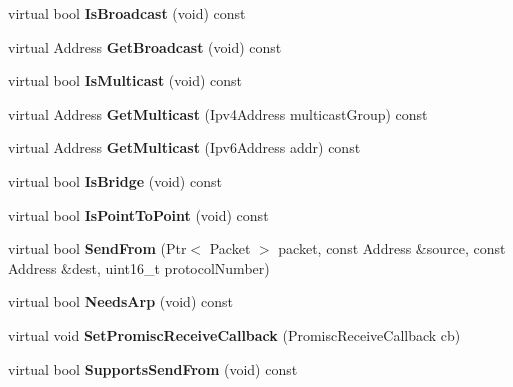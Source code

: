 \begin{DoxyCompactItemize}
virtual bool {\bfseries Is\+Broadcast} (void) const
\item 
\mbox{\label{classns3_1_1lorawan_1_1LoraNetDevice_ae1a300c93225ad2c6883a9a94fdaec7d}} 
virtual Address {\bfseries Get\+Broadcast} (void) const
\item 
\mbox{\label{classns3_1_1lorawan_1_1LoraNetDevice_a6a18359bc6d5810de4429724d9739f4b}} 
virtual bool {\bfseries Is\+Multicast} (void) const
\item 
\mbox{\label{classns3_1_1lorawan_1_1LoraNetDevice_ae7c31bab486f11391f45adadb68bea28}} 
virtual Address {\bfseries Get\+Multicast} (Ipv4\+Address multicast\+Group) const
\item 
\mbox{\label{classns3_1_1lorawan_1_1LoraNetDevice_a78323bf432c46c08f85778b2302c2d9d}} 
virtual Address {\bfseries Get\+Multicast} (Ipv6\+Address addr) const
\item 
\mbox{\label{classns3_1_1lorawan_1_1LoraNetDevice_a627f1c69aae3e26cf636ce552e2935df}} 
virtual bool {\bfseries Is\+Bridge} (void) const
\item 
\mbox{\label{classns3_1_1lorawan_1_1LoraNetDevice_aaba6ad5f7ae5116faaa3cf187b3ff2b4}} 
virtual bool {\bfseries Is\+Point\+To\+Point} (void) const
\item 
\mbox{\label{classns3_1_1lorawan_1_1LoraNetDevice_a1599faad5fed49743df75e92fd85a5f6}} 
virtual bool {\bfseries Send\+From} (Ptr$<$ Packet $>$ packet, const Address \&source, const Address \&dest, uint16\+\_\+t protocol\+Number)
\item 
\mbox{\label{classns3_1_1lorawan_1_1LoraNetDevice_a51420025e2f9a1c625ea25a9c8928d35}} 
virtual bool {\bfseries Needs\+Arp} (void) const
\item 
\mbox{\label{classns3_1_1lorawan_1_1LoraNetDevice_ae984d46514ee678426669b7dd40bf97e}} 
virtual void {\bfseries Set\+Promisc\+Receive\+Callback} (Promisc\+Receive\+Callback cb)
\item 
\mbox{\label{classns3_1_1lorawan_1_1LoraNetDevice_a10ed1ae7d2d3f0e48a150052b952190a}} 
virtual bool {\bfseries Supports\+Send\+From} (void) const
\end{DoxyCompactItemize}
